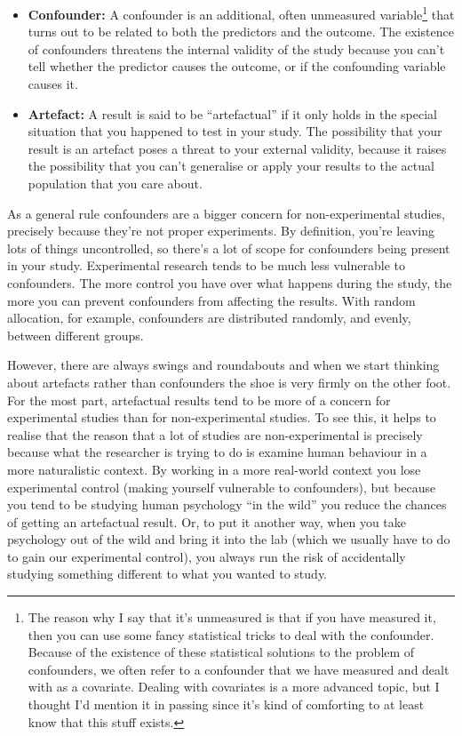 \documentclass[
  a4paper,
]{book}
\providecommand{\tightlist}{%
  \setlength{\itemsep}{0pt}\setlength{\parskip}{0pt}}
\begin{document}
\begin{itemize}
\tightlist
\item
  \textbf{Confounder:} A confounder is an additional, often unmeasured
  variable\footnote{The reason why I say that it's unmeasured is that if
    you have measured it, then you can use some fancy statistical tricks
    to deal with the confounder. Because of the existence of these
    statistical solutions to the problem of confounders, we often refer
    to a confounder that we have measured and dealt with as a covariate.
    Dealing with covariates is a more advanced topic, but I thought I'd
    mention it in passing since it's kind of comforting to at least know
    that this stuff exists.} that turns out to be related to both the
  predictors and the outcome. The existence of confounders threatens the
  internal validity of the study because you can't tell whether the
  predictor causes the outcome, or if the confounding variable causes
  it.
\item
  \textbf{Artefact:} A result is said to be ``artefactual'' if it only
  holds in the special situation that you happened to test in your
  study. The possibility that your result is an artefact poses a threat
  to your external validity, because it raises the possibility that you
  can't generalise or apply your results to the actual population that
  you care about.
\end{itemize}

As a general rule confounders are a bigger concern for non-experimental
studies, precisely because they're not proper experiments. By
definition, you're leaving lots of things uncontrolled, so there's a lot
of scope for confounders being present in your study. Experimental
research tends to be much less vulnerable to confounders. The more
control you have over what happens during the study, the more you can
prevent confounders from affecting the results. With random allocation,
for example, confounders are distributed randomly, and evenly, between
different groups.

However, there are always swings and roundabouts and when we start
thinking about artefacts rather than confounders the shoe is very firmly
on the other foot. For the most part, artefactual results tend to be
more of a concern for experimental studies than for non-experimental
studies. To see this, it helps to realise that the reason that a lot of
studies are non-experimental is precisely because what the researcher is
trying to do is examine human behaviour in a more naturalistic context.
By working in a more real-world context you lose experimental control
(making yourself vulnerable to confounders), but because you tend to be
studying human psychology ``in the wild'' you reduce the chances of
getting an artefactual result. Or, to put it another way, when you take
psychology out of the wild and bring it into the lab (which we usually
have to do to gain our experimental control), you always run the risk of
accidentally studying something different to what you wanted to study.
\end{document}
